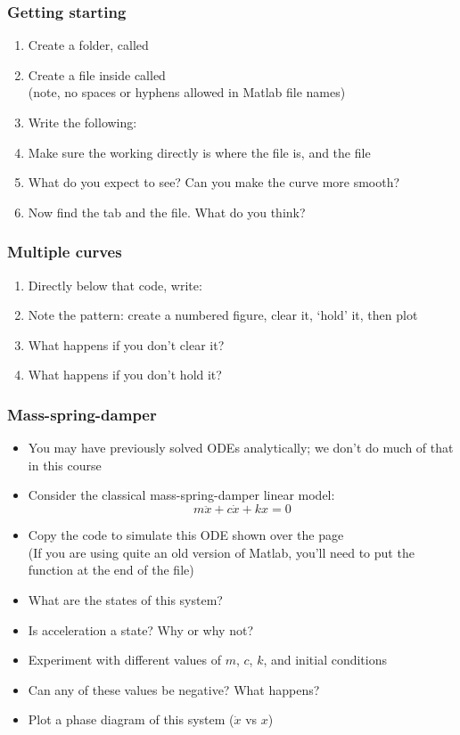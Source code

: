 \documentclass[9pt]{beamer-control}
\begin{document}
\begin{frame}
\frametitle{Getting starting}
\begin{enumerate}
\item Create a folder, called 
\item Create a file inside called \\(note, no spaces or hyphens allowed in Matlab file names)
\item Write the following:
\item Make sure the working directly is where the file is, and  the file
\item What do you expect to see? Can you make the curve more smooth?
\item Now find the  tab and  the file. What do you think?
\end{enumerate}
\end{frame}
\begin{frame}

\frametitle{Multiple curves}
\begin{enumerate}
\item Directly below that code, write:
\item Note the pattern: create a numbered figure, clear it, `hold' it, then plot
\item What happens if you don't clear it?
\item What happens if you don't hold it?
\end{enumerate}
\end{frame}

\begin{frame}
\frametitle{Mass-spring-damper}
\begin{itemize}
\item You may have previously solved ODEs analytically; we don't do much of that in this course
\item Consider the classical mass-spring-damper linear model:
\[
   m\ddot x + c\dot x + k x = 0
\] 
\item Copy the code to simulate this ODE shown over the page\\
 (If you are using quite an old version of Matlab, you'll need to put the function at the end of the file)
\item What are the states of this system?
\item Is acceleration a state? Why or why not?
\item Experiment with different values of $m$, $c$, $k$, and initial conditions
\item Can any of these values be negative? What happens?
\item Plot a phase diagram of this system ($\dot x$ vs $x$)
\end{itemize}
\end{frame}
\end{document}
